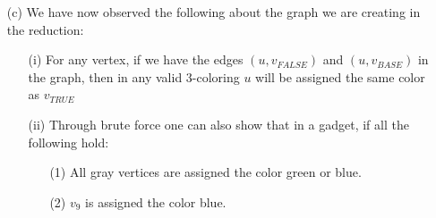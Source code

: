\documentclass{article}
\begin{document}
\begin{itemize}
        \item [(c)] We have now observed the following about the graph we are creating in the reduction:
            \begin{itemize}
                \item [(i)] For any vertex, if we have the edges $(u, v_{FALSE})$ and $(u, v_{BASE})$ in the graph, then in any valid $3$-coloring $u$ will be assigned the same color as $v_{TRUE}$

                \item [(ii)] Through brute force one can also show that in a gadget, if all the following hold:
                    \begin{itemize}
                        \item [(1)] All gray vertices are assigned the color green or blue.

                        \item [(2)] $v_{9}$ is assigned the color blue.


\end{itemize}
\end{itemize}
\end{itemize}
\end{document}
